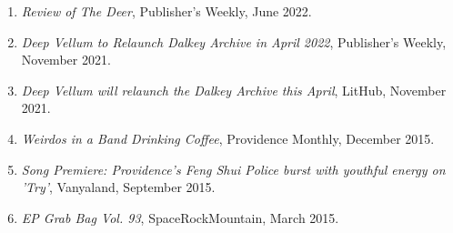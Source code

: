 \begin{enumerate}
 \item  \emph{Review of The Deer}, Publisher's Weekly, June 2022. \\
\item  \emph{Deep Vellum to Relaunch Dalkey Archive in April 2022}, Publisher's Weekly, November 2021. \\
\item \emph{Deep Vellum will relaunch the Dalkey Archive this April}, LitHub, November 2021.\\
\item \emph{Weirdos in a Band Drinking Coffee}, Providence Monthly, December 2015.\\
\item \emph{Song Premiere: Providence's Feng Shui Police burst with youthful energy on 'Try'}, Vanyaland, September 2015.\\
\item \emph{EP Grab Bag Vol. 93}, SpaceRockMountain, March 2015.

\end{enumerate}
 
 
